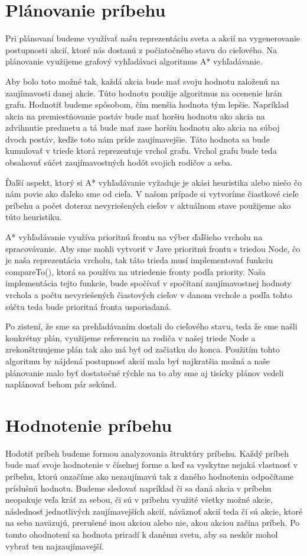 \section{Plánovanie príbehu}
Pri plánovaní budeme využívať našu reprezentáciu sveta a akcií na vygenerovanie postupnosti akcií, ktoré nás dostanú z počiatočného stavu do cieľového. Na plánovanie využijeme grafový vyhľadávaci algoritmus A* vyhľadávanie.\par
Aby bolo toto možné tak, každá akcia bude mať svoju hodnotu založenú na zaujímavosti danej akcie. Túto hodnotu použije algoritmus na ocenenie hrán grafu. Hodnotiť budeme spôsobom, čím menšia hodnota tým lepšie. Napríklad akcia na premiestňovanie postáv bude mať horšiu hodnotu ako akcia na zdvihnutie predmetu a tá bude mať zase horšiu hodnotu ako akcia na súboj dvoch postáv, keďže toto nám príde zaujímavejšie. Táto hodnota sa bude kumulovať v triede ktorá reprezentuje vrchol grafu. Vrchol grafu bude teda obsahovať súčet zaujímavostných hodôt svojich rodičov a seba.\par
Ďaľší aspekt, ktorý si A* vyhľadávanie vyžaduje je akási heuristika alebo niečo čo nám povie ako ďaľeko sme od cieľa. V našom prípade si vytvoríme čiastkové cieľe príbehu a počet doteraz nevyriešených cieľov v aktuálnom stave použijeme ako túto heuristiku.\par
A* vyhľadávanie využíva prioritnú frontu na výber ďaľšieho vrcholu na spracovávanie. Aby sme mohli vytvoriť v Jave prioritnú frontu s triedou Node, čo je naša reprezentácia vrcholu, tak táto trieda musí implementovať funkciu compareTo(), ktorá sa používa na utriedenie fronty podľa priority. Naša implementácia tejto funkcie, bude spočívať v spočítaní zaujímavostnej hodnoty vrchola a počtu nevyriešených čiastových cieľov v danom vrchole a podľa tohto súčtu teda bude prioritná fronta usporiadaná. \par
Po zistení, že sme sa prehľadávaním dostali do cieľového stavu, teda že sme našli konkrétny plán, využijeme referenciu na rodiča v našej triede Node a zrekonštruujeme plán tak ako má byť od začiatku do konca. Použitím tohto algoritmu by nájdená postupnosť akcií mala byť najkratšia možná a naše plánovanie malo byť dostatočné rýchle na to aby sme aj tisícky plánov vedeli naplánovať behom pár sekúnd.
\section{Hodnotenie príbehu}
Hodotiť príbeh budeme formou analyzovania štruktúry príbehu. Každý príbeh bude mať svoje hodnotenie v číselnej forme a keď sa vyskytne nejaká vlastnosť v príbehu, ktorú onzačíme ako nezaujímavú tak z daného hodnotenia odpočítame príslušnú hodnotu. Budeme sledovať napríklad či sa daná akcia v príbehu neopakuje veľa kráť za sebou, či sú v príbehu využité všetky možné akcie, následnosť jednotlivých zaujímavejších akcií, náväznoť akcií teda či sú akcie, ktoré na seba naväzujú, prerušené inou akciou alebo nie, akou akciou začína príbeh. Po tomto ohodnotení sa hodnota priradí k danému svetu, aby sa neskôr mohol vybrať ten najzaujímavejší.
